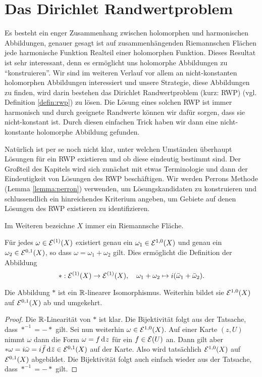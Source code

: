
\section{Das Dirichlet Randwertproblem}
\label{sec:Dirichlet}

Es besteht ein enger Zusammenhang zwischen holomorphen und
harmonischen Abbildungen, genauer gesagt ist auf
zusammenhängenden Riemannschen Flächen jede harmonische Funktion
Realteil einer holomorphen Funktion. Dieses Resultat ist sehr
interessant, denn es ermöglicht uns holomorphe Abbildungen zu
"`konstruieren"'. Wir sind im weiteren Verlauf vor allem an
nicht-konstanten holomorphen Abbildungen interessiert und unsere
Strategie, diese Abbildungen zu finden, wird darin bestehen das
Dirichlet Randwertproblem (kurz: RWP) (vgl. Definition
\ref{defin:rwp}) zu lösen. Die Lösung eines solchen RWP ist immer
harmonisch und durch geeignete Randwerte können wir dafür sorgen, dass
sie nicht-konstant ist. Durch diesen einfachen Trick haben wir dann
eine nicht-konstante holomorphe Abbildung gefunden.

Natürlich ist per se noch nicht klar, unter welchen Umständen
überhaupt Lösungen für ein RWP existieren und ob diese eindeutig
bestimmt sind. Der Großteil des Kapitels wird sich zunächst mit etwas
Terminologie und dann der Eindeutigkeit von Lösungen des RWP
beschäftigen. Wir werden Perrons Methode (Lemma \ref{lemma:perron})
verwenden, um Lösungskandidaten zu konstruieren und schlussendlich ein
hinreichendes Kriterium angeben, um Gebiete auf denen Lösungen des RWP
existieren zu identifizieren.

Im Weiteren bezeichne $X$ immer ein Riemannsche Fläche.

\begin{defin}
  Für jedes $\omega \in \mathcal{E}^{(1)}(X)$ existiert genau ein $\omega_1
  \in \mathcal{E}^{1,0}(X)$ und genau ein $\omega_2 \in \mathcal{E}^{0,1}(X)$, so
  dass $\omega = \omega_1 + \omega_2$ gilt. Dies ermöglicht die
  Definition der Abbildung
  \[
  \ast : \mathcal{E}^{(1)}(X) \rightarrow \mathcal{E}^{(1)}(X), \quad \omega_1 + \omega_2
  \mapsto i(\bar \omega_1 + \bar \omega_2).
  \]
\end{defin}

\begin{prop}
  Die Abbildung $\ast$ ist ein $\mathbb{R}$-linearer Isomorphismus. Weiterhin
  bildet sie  $\mathcal{E}^{1,0}(X)$ auf $\mathcal{E}^{0,1}(X)$ ab und umgekehrt.
\end{prop}

\begin{proof}
  Die $\mathbb{R}$-Linearität von $\ast$ ist klar. Die Bijektivität folgt aus
  der Tatsache, dass $\ast^{-1} = - \ast$ gilt. Sei nun weiterhin
  $\omega \in \mathcal{E}^{1,0}(X)$. Auf einer Karte $(z,U)$ nimmt $\omega$
  dann die Form $\omega = f \d[z]$ für ein $f \in \mathcal{E}(U)$ an. Dann gilt
  aber $\ast \omega = i \bar \omega = i \bar f \d[\bar z] \in
  \diff^{0,1}(X)$ auf der Karte. Also wird tatsächlich
  $\mathcal{E}^{1,0}(X)$ auf $\mathcal{E}^{0,1}(X)$ abgebildet. Die Bijektivität
  folgt auch einfach wieder aus der Tatsache, dass $\ast^{-1} = -
  \ast$ gilt.
\end{proof}


